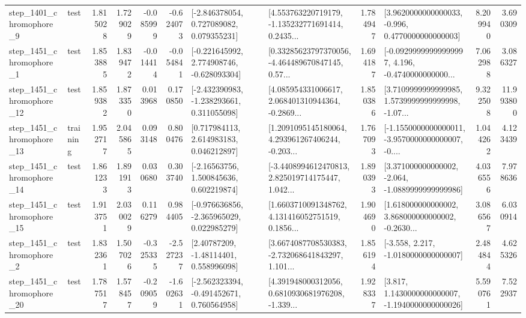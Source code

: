 \begin{tabular}{llrrrrllrlrr}
  step\_1401\_chromophore\_9 &      test &      1.815028 &    1.729029 &     -0.085999 & -0.624073 &    [-2.846378054, 0.727089082, 0.079355231] &  [4.553763220719179, -1.135232771691414, 0.2435... &       1.784947 &   [3.9620000000000033, -0.996, 0.4770000000000003] &            8.209940 &          3.690309 \\
  step\_1451\_chromophore\_1 &      test &      1.853885 &    1.839472 &     -0.014414 & -0.054841 &   [-0.221645992, 2.774908746, -0.628093304] &  [0.33285623797370056, -4.464489670847145, 0.57... &       1.694187 &  [-0.09299999999999997, 4.196, -0.4740000000000... &            7.062988 &          3.086327 \\
 step\_1451\_chromophore\_12 &      test &      1.859382 &    1.873350 &      0.013968 &  0.170850 &   [-2.432390983, -1.238293661, 0.311055098] &  [4.085954331006617, 2.068401310944364, -0.2869... &       1.850386 &  [3.7109999999999985, 1.5739999999999998, -1.07... &            9.322508 &         11.993800 \\
 step\_1451\_chromophore\_13 &  training &      1.952717 &    2.045865 &      0.093148 &  0.800476 &     [0.717984113, 2.614983183, 0.046212897] &  [1.2091095145180064, 4.293961267406244, -0.203... &       1.767093 &  [-1.1550000000000011, -3.9570000000000007, -0.... &            1.044262 &          4.123439 \\
 step\_1451\_chromophore\_14 &      test &      1.861233 &    1.891913 &      0.030680 &  0.303740 &     [-2.16563756, 1.500845636, 0.602219874] &  [-3.4408994612470813, 2.825019714175447, 1.042... &       1.890393 &   [3.371000000000002, -2.064, -1.0889999999999986] &            4.036556 &          7.978636 \\
 step\_1451\_chromophore\_15 &      test &      1.913751 &    2.030029 &      0.116279 &  0.984405 &   [-0.976636856, -2.365965029, 0.022985279] &  [1.6603710091348762, 4.131416052751519, 0.1856... &       1.904690 &  [1.618000000000002, 3.868000000000002, -0.2630... &            3.086567 &          6.030914 \\
  step\_1451\_chromophore\_2 &      test &      1.832361 &    1.507026 &     -0.325335 & -2.527237 &      [2.40787209, -1.48114401, 0.558996098] &  [3.6674087708530383, -2.732068641843297, 1.101... &       1.856194 &               [-3.558, 2.217, -1.0180000000000007] &            2.484844 &          4.625326 \\
 step\_1451\_chromophore\_20 &      test &      1.787517 &    1.578457 &     -0.209059 & -1.602631 &   [-2.562323394, -0.491452671, 0.760564958] &  [4.391948000312056, 0.6810930681976208, -1.339... &       1.928337 &   [3.817, 1.1430000000000007, -1.1940000000000026] &            5.590761 &          7.522937 \\

\end{tabular}
